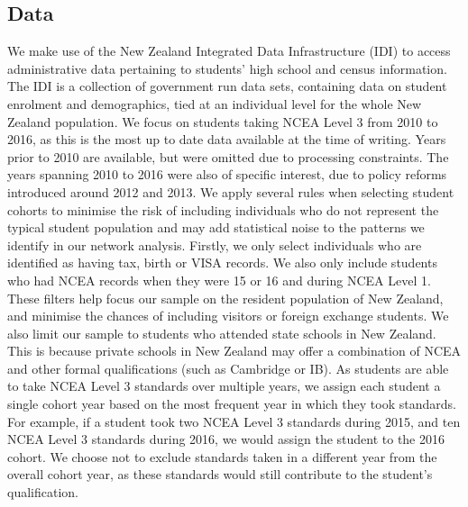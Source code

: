 \subsection{Data}
We make use of the New Zealand Integrated Data Infrastructure (IDI) to access administrative data pertaining to students' high school and census information. The IDI is a collection of government run data sets, containing data on student enrolment and demographics, tied at an individual level for the whole New Zealand population. We focus on students taking NCEA Level 3 from 2010 to 2016, as this is the most up to date data available at the time of writing. Years prior to 2010 are available, but were omitted due to processing constraints. The years spanning 2010 to 2016 were also of specific interest, due to policy reforms introduced around 2012 and 2013. We apply several rules when selecting student cohorts to minimise the risk of including individuals who do not represent the typical student population and may add statistical noise to the patterns we identify in our network analysis. Firstly, we only select individuals who are identified as having tax, birth or VISA records. We also only include students who had NCEA records when they were 15 or 16 and during NCEA Level 1. These filters help focus our sample on the resident population of New Zealand, and minimise the chances of including visitors or foreign exchange students. We also limit our sample to students who attended state schools in New Zealand. This is because private schools in New Zealand may offer a combination of NCEA and other formal qualifications (such as Cambridge or IB). As students are able to take NCEA Level 3 standards over multiple years, we assign each student a single cohort year based on the most frequent year in which they took standards. For example, if a student took two NCEA Level 3 standards during 2015, and ten NCEA Level 3 standards during 2016, we would assign the student to the 2016 cohort. We choose not to exclude standards taken in a different year from the overall cohort year, as these standards would still contribute to the student's qualification.

